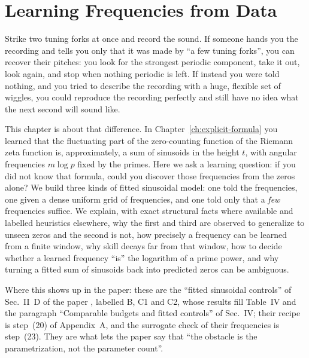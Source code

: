 \chapter{Learning Frequencies from Data}\label{ch:sparse-frequency}

\begin{chapterintro}
Strike two tuning forks at once and record the sound. If someone hands you the recording and tells you only that it was made by ``a few tuning forks'', you can recover their pitches: you look for the strongest periodic component, take it out, look again, and stop when nothing periodic is left. If instead you were told nothing, and you tried to describe the recording with a huge, flexible set of wiggles, you could reproduce the recording perfectly and still have no idea what the next second will sound like.

This chapter is about that difference. In Chapter~\ref{ch:explicit-formula} you learned that the fluctuating part of the zero-counting function of the Riemann zeta function is, approximately, a sum of sinusoids in the height $t$, with angular frequencies $m\log p$ fixed by the primes. Here we ask a learning question: if you did not know that formula, could you discover those frequencies from the zeros alone? We build three kinds of fitted sinusoidal model: one told the frequencies, one given a dense uniform grid of frequencies, and one told only that a \emph{few} frequencies suffice. We explain, with exact structural facts where available and labelled heuristics elsewhere, why the first and third are observed to generalize to unseen zeros and the second is not, how precisely a frequency can be learned from a finite window, why skill decays far from that window, how to decide whether a learned frequency ``is'' the logarithm of a prime power, and why turning a fitted sum of sinusoids back into predicted zeros can be ambiguous.

Where this shows up in the paper: these are the ``fitted sinusoidal controls'' of Sec.~II~D of the paper \cite{soniR1}, labelled B, C1 and C2, whose results fill Table~IV and the paragraph ``Comparable budgets and fitted controls'' of Sec.~IV; their recipe is step~(20) of Appendix~A, and the surrogate check of their frequencies is step~(23). They are what lets the paper say that ``the obstacle is the parametrization, not the parameter count''.
\end{chapterintro}

